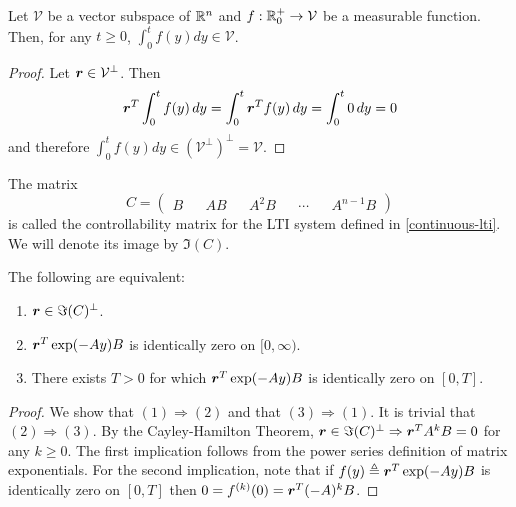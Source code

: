 \begin{lemma}
\label{integral-invariance}
Let $\mathcal{V}$ be a vector subspace of $\mathbb{R}^{n}$ and $f : \mathbb{R}^{+}_{0} \rightarrow \mathcal{V}$ be a measurable function. Then, for any $t \geq 0$, $\int_{0}^{t} f(y) dy \in \mathcal{V}$.
\end{lemma}

\begin{proof}
Let $\boldsymbol{r} \in \mathcal{V}^{\perp}$. Then
\begin{equation*}
\boldsymbol{r}^{T} \int_{0}^{t} f(y) \, dy = \int_{0}^{t} \boldsymbol{r}^{T} f(y) \, dy = \int_{0}^{t} 0 \, dy = 0
\end{equation*}
and therefore $\int_{0}^{t} f(y) dy \in (\mathcal{V}^{\perp})^{\perp} = \mathcal{V}$.
\end{proof}

The matrix
\begin{equation}
C= \begin{pmatrix} B && AB && A^{2} B && \cdots && A^{n-1}B \end{pmatrix}
\end{equation}
is called the controllability matrix for the LTI system defined in \cref{continuous-lti}. We will denote its image by $\Im(C)$.

\begin{lemma}
\label{orthogonality-equivalence}
The following are equivalent:
\begin{enumerate}
\item $\boldsymbol{r} \in \Im(C)^{\perp}$.
\item $\boldsymbol{r}^{T} \exp(-Ay) B$ is identically zero on $[0,\infty)$.
\item There exists $T>0$ for which $\boldsymbol{r}^{T} \exp(-Ay) B$ is identically zero on $[0,T]$.
\end{enumerate}
\end{lemma}

\begin{proof}
We show that $(1) \Rightarrow (2)$ and that $(3) \Rightarrow (1)$. It is trivial that $(2) \Rightarrow (3)$.
By the Cayley-Hamilton Theorem, $\boldsymbol{r} \in \Im(C)^{\perp} \Rightarrow \boldsymbol{r}^{T} A^{k} B = 0$ for any $k \geq 0$. The first implication follows from the power series definition of matrix exponentials. For the second implication, note that if $f(y) \triangleq \boldsymbol{r}^{T} \exp(-Ay) B$ is identically zero on $[0,T]$ then $0 = f^{(k)} (0) = \boldsymbol{r}^{T} (-A)^{k} B$.
\end{proof}

